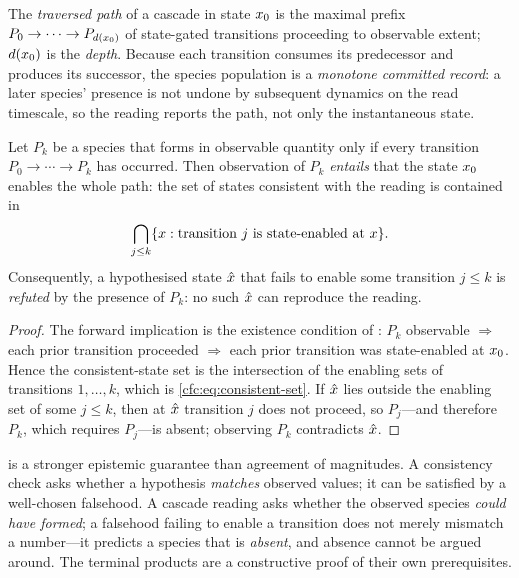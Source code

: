 \begin{definition}
\label{cfc:def:trajectory}
The \emph{traversed path} of a cascade in state $x_0$ is the maximal prefix
$P_0\to\cdots\to P_{d(x_0)}$ of state-gated transitions proceeding to
observable extent; $d(x_0)$ is the \emph{depth}. Because each transition
consumes its predecessor and produces its successor, the species population is
a \emph{monotone committed record}: a later species' presence is not undone by
subsequent dynamics on the read timescale, so the reading reports the path, not
only the instantaneous state.
\end{definition}

\begin{theorem}
\label{cfc:thm:certificate}
Let $P_k$ be a species that forms in observable quantity only if every
transition $P_0\to\cdots\to P_k$ has occurred. Then observation of $P_k$
\emph{entails} that the state $x_0$ enables the whole path: the set of states
consistent with the reading is contained in
\begin{equation}
\bigcap_{j\le k}\{x:\text{transition }j\text{ is state-enabled at }x\}.
\label{cfc:eq:consistent-set}
\end{equation}
Consequently, a hypothesised state $\hat{x}$ that fails to enable some
transition $j\le k$ is \emph{refuted} by the presence of $P_k$: no such
$\hat{x}$ can reproduce the reading.
\end{theorem}

\begin{proof}
The forward implication is the existence condition of :
$P_k$ observable $\Rightarrow$ each prior transition proceeded $\Rightarrow$
each prior transition was state-enabled at $x_0$. Hence the consistent-state
set is the intersection of the enabling sets of transitions $1,\dots,k$, which
is \eqref{cfc:eq:consistent-set}. If $\hat{x}$ lies outside the enabling set of
some $j\le k$, then at $\hat{x}$ transition $j$ does not proceed, so $P_j$---and
therefore $P_k$, which requires $P_j$---is absent; observing $P_k$ contradicts
$\hat{x}$.
\end{proof}

\begin{principle}
\label{cfc:prin:existence}
 is a stronger epistemic guarantee than agreement of
magnitudes. A consistency check asks whether a hypothesis \emph{matches}
observed values; it can be satisfied by a well-chosen falsehood. A cascade
reading asks whether the observed species \emph{could have formed}; a falsehood
failing to enable a transition does not merely mismatch a number---it predicts
a species that is \emph{absent}, and absence cannot be argued around. The
terminal products are a constructive proof of their own prerequisites.
\end{principle}

